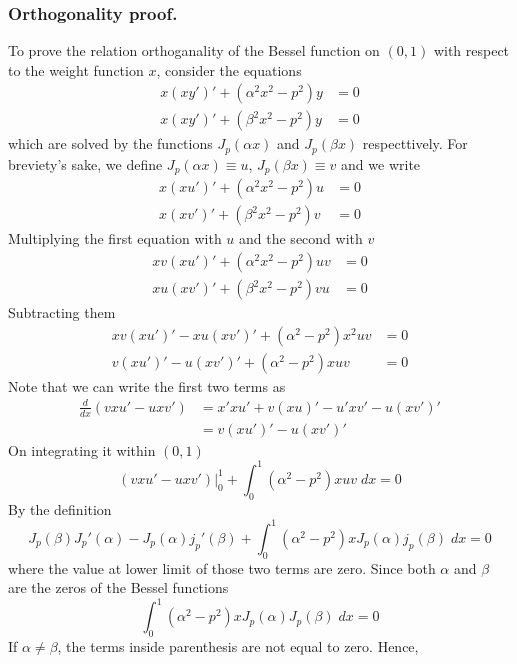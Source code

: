 \documentclass[../main.tex]{subfiles}
\begin{document}
\subsubsection*{Orthogonality proof.} To prove the relation orthoganality of the Bessel function on $(0,1)$ with respect to the weight function $x$, consider the equations 
\begin{align*}
    x(xy')'+(\alpha^2x^2-p^2)y&=0\\
    x(xy')'+(\beta^2x^2-p^2)y&=0
\end{align*}
which are solved by the functions $J_p(\alpha x)$ and $J_p(\beta x)$ respecttively. For breviety's sake, we define $J_p(\alpha x)\equiv u$,  $J_p(\beta x)\equiv v$ and we write
\begin{align*}
    x(xu')'+(\alpha^2x^2-p^2)u&=0\\
    x(xv')'+(\beta^2x^2-p^2)v&=0
\end{align*}
Multiplying the first equation with $u$ and the second with $v$
\begin{align*}
    xv(xu')'+(\alpha^2x^2-p^2)uv&=0\\
    xu(xv')'+(\beta^2x^2-p^2)vu&=0
\end{align*}
Subtracting them 
\begin{align*}
    xv(xu')'-xu(xv')'+(\alpha^2-p^2)x^2uv&=0\\
    v(xu')'-u(xv')'+(\alpha^2-p^2)xuv&=0
\end{align*}
Note that we can write the first two terms as
\begin{align*}
    \frac{d}{dx}\left(vxu'-uxv'\right)&=x'xu'+v(xu)'-u'xv'-u(xv')'\\
    &=v(xu')'-u(xv')'
\end{align*}
On integrating it within $(0,1)$
\begin{equation*}
    \left(vxu'-uxv'\right)\bigg|_0^1+\int_{0}^{1}(\alpha^2-p^2)xuv\;dx=0
\end{equation*}
By the definition
\begin{equation*}
    J_p(\beta)J_p'(\alpha) -J_p(\alpha)j_p'(\beta) +\int_{0}^{1}(\alpha^2-p^2)xJ_p(\alpha)j_p(\beta)\;dx=0
\end{equation*}
where the value at lower limit of those two terms are zero. Since both $\alpha$ and $\beta$ are the zeros of the Bessel functions
\begin{equation*}
    \int_{0}^{1}(\alpha^2-p^2)xJ_p(\alpha)J_p(\beta)\;dx=0
\end{equation*}
If $\alpha\neq\beta$, the terms inside parenthesis are not equal to zero. Hence,
\end{document}
